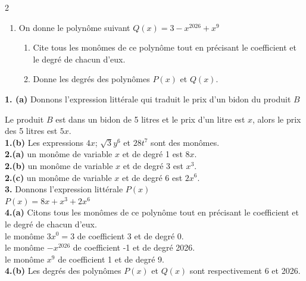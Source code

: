 \begin{multicols*}{2}
\begin{enumerate}
  		\item On donne le polynôme suivant $Q(x)=3-x^{2026}+x^{9}$ 
  		\begin{enumerate}
  			\item Cite tous les monômes de ce polynôme tout en précisant le coefficient et le degré de chacun d'eux.
  			\item  Donne les degrés des polynômes $P(x)$ et $Q(x)$.
  		\end{enumerate}
  	\end{enumerate}
  	\dure
  	\resul
  	\textbf{1. (a)} Donnons l'expression littérale qui traduit le prix d'un bidon du produit $B$
  	
  	Le produit $B$ est dans un bidon de 5 litres et le prix d'un litre est $x$, alors le prix  des 5 litres est $5x$. \\
  	\textbf{1.(b)} Les expressions $4x$; $\sqrt{3}y^6$ et $28t^7$ sont des monômes.\\
  	\textbf{2.(a)} un monôme de variable $x$ et de degré 1 est $8x$.\\
  	\textbf{2.(b)} un monôme de variable $x$ et de degré 3 est $x^3$.\\
  	\textbf{2.(c)} un monôme de variable $x$ et de degré 6 est $2x^6$.\\
  	\textbf{3.} Donnons l'expression littérale $P(x)$\\
  	$P(x)=8x+x^3+2x^6$\\
  	\textbf{4.(a)} Citons tous les monômes de ce polynôme tout en précisant le coefficient et le degré de chacun d'eux.\\
  	 le monôme $3x^0=3$ de coefficient 3  et de degré 0.\\
  	 le monôme $-x^{2026}$ de coefficient -1  et de degré 2026.\\
  	 le monôme $x^{9}$ de coefficient 1  et de degré 9.\\
  	\textbf{4.(b)} Les degrés des polynômes $P(x)$ et $Q(x)$ sont respectivement 6 et 2026.
  	
\end{multicols*}
